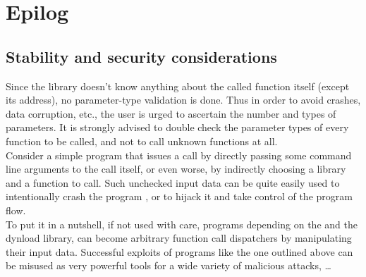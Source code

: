 %
%
%
%

\newpage

\section{Epilog}

\subsection{Stability and security considerations}

Since the  library doesn't know anything about the called
function itself (except its address), no parameter-type validation is done.
Thus in order to avoid crashes, data corruption, etc., the user is urged
to ascertain the number and types of parameters. It is strongly advised to
double check the parameter types of every function to be called, and not to
call unknown functions at all.\\

Consider a simple program that issues a call by directly passing some
command line arguments to the call itself, or even worse, by indirectly
choosing a library and a function to call. Such unchecked input data can be
quite easily used to intentionally crash the program , or to hijack it and
take control of the program flow.\\
To put it in a nutshell, if not used with care, programs depending on the
 and the dynload library, can become arbitrary function
call dispatchers by manipulating their input data. Successful exploits of
programs like the one outlined above can be misused as very powerful tools
for a wide variety of malicious attacks, \ldots
 

